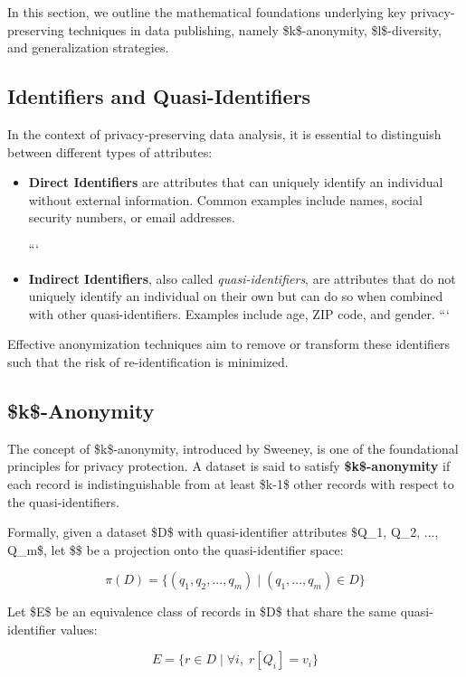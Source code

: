 \documentclass{article}
\begin{document}
In this section, we outline the mathematical foundations underlying key privacy-preserving techniques in data publishing, namely \$k\$-anonymity, \$l\$-diversity, and generalization strategies.

\subsection{Identifiers and Quasi-Identifiers}

In the context of privacy-preserving data analysis, it is essential to distinguish between different types of attributes:

\begin{itemize}
\item \textbf{Direct Identifiers} are attributes that can uniquely identify an individual without external information. Common examples include names, social security numbers, or email addresses.

```
\item \textbf{Indirect Identifiers}, also called \textit{quasi-identifiers}, are attributes that do not uniquely identify an individual on their own but can do so when combined with other quasi-identifiers. Examples include age, ZIP code, and gender.
```

\end{itemize}

Effective anonymization techniques aim to remove or transform these identifiers such that the risk of re-identification is minimized.

\subsection{\$k\$-Anonymity}

The concept of \$k\$-anonymity, introduced by Sweeney, is one of the foundational principles for privacy protection. A dataset is said to satisfy \textbf{\$k\$-anonymity} if each record is indistinguishable from at least \$k-1\$ other records with respect to the quasi-identifiers.

Formally, given a dataset \$D\$ with quasi-identifier attributes \$Q\_1, Q\_2, ..., Q\_m\$, let \$\pi\$ be a projection onto the quasi-identifier space:

$$
\pi(D) = \{ (q_1, q_2, ..., q_m) \mid (q_1, ..., q_m) \in D \}
$$

Let \$E\$ be an equivalence class of records in \$D\$ that share the same quasi-identifier values:

$$
E = \{ r \in D \mid \forall i, \; r[Q_i] = v_i \}
$$
\end{document}
